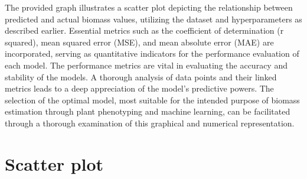 \documentclass[a4paper,12pt]{report}%
\renewcommand{\\}{\vspace*{0.5\baselineskip} \newline}
\begin{document}
\noindent The provided graph illustrates a scatter plot depicting the relationship between predicted and actual biomass values, utilizing the dataset and hyperparameters as described earlier. Essential metrics such as the coefficient of determination (r squared), mean squared error (MSE), and mean absolute error (MAE) are incorporated, serving as quantitative indicators for the performance evaluation of each model. The performance metrics are vital in evaluating the accuracy and stability of the models. A thorough analysis of data points and their linked metrics leads to a deep appreciation of the model's predictive powers. The selection of the optimal model, most suitable for the intended purpose of biomass estimation through plant phenotyping and machine learning, can be facilitated through a thorough examination of this graphical and numerical representation.

\section{Scatter plot}
\end{document}
